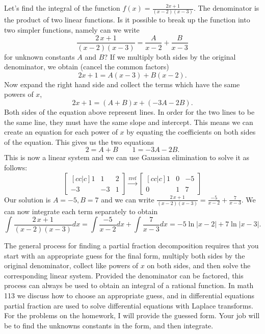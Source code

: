 \documentclass[10pt]{article}
\newcommand{\ds}{\displaystyle}
\begin{document}
Let's find the integral of the function $\ds f(x)= {\frac {2x+1}{ \left( x-2 \right)  \left( x-3 \right) }}$. The denominator is the product of two linear functions. Is it possible to break up the function into two simpler functions, namely can we write 
$${\frac {2\,x+1}{ \left( x-2 \right)  \left( x-3 \right) }}={\frac {A}{
x-2}}+{\frac {B}{x-3}}$$
for unknown constants $A$ and $B$? If we multiply both sides by the original denominator, we obtain (cancel the common factors)
$$2x+1 = A(x-3)+B(x-2).$$
Now expand the right hand side and collect the terms which have the same powers of $x$, 
$$2x+1 = (A+B)x+(-3A-2B).$$
Both sides of the equation above represent lines. In order for the two lines to be the same line, they must have the same slope and intercept.  This means we can create an equation for each power of $x$ by equating the coefficients on both sides of the equation.  This gives us the two equations
$$2=A+B \quad \quad 1=-3A-2B.$$
This is now a linear system and we can use Gaussian elimination to solve it as follows:
$$
\begin{bmatrix}[cc|c]
1&1&2\\
-3&-3&1
\end{bmatrix}
\xrightarrow{\text{rref}}
\begin{bmatrix}[cc|c]
1&0&-5\\
0&1&7
\end{bmatrix}
$$
Our solution is $A=-5,B=7$ and we can write ${\frac {2\,x+1}{ \left( x-2 \right)  \left( x-3 \right) }}={\frac {-5}{
x-2}}+{\frac {7}{x-3}}$. We can now integrate each term separately to obtain 
$$\int{\frac {2\,x+1}{ \left( x-2 \right)  \left( x-3 \right) }}dx 
= \int {\frac {-5}{x-2}} dx +\int{\frac {7}{x-3}}dx
= {-5}\ln|{x-2}|+7\ln|{x-3}|.
$$

The general process for finding a partial fraction decomposition requires that you start with an appropriate guess for the final form, multiply both sides by the original denominator, collect like powers of $x$ on both sides, and then solve the corresponding linear system. Provided the denominator can be factored, this process can always be used to obtain an integral of a rational function. In math 113 we discuss how to choose an appropriate guess, and in differential equations partial fraction are used to solve differential equations with Laplace transforms. For the problems on the homework, I will provide the guessed form. Your job will be to find the unknowns constants in the form, and then integrate.
\end{document}
